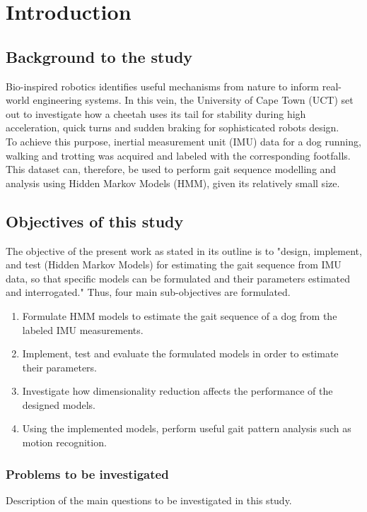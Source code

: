 \chapter{Introduction}

\section{Background to the study}
Bio-inspired robotics identifies useful mechanisms from nature to inform real-world engineering systems. In this vein, the University of Cape Town (UCT) set out to investigate how a cheetah uses its tail for stability during high acceleration, quick turns and sudden braking for sophisticated robots design. \\
To achieve this purpose, inertial measurement unit (IMU) data for a dog running, walking and trotting was acquired and labeled with the corresponding footfalls.\\
This dataset can, therefore, be used to perform gait sequence modelling and analysis using Hidden Markov Models (HMM), given its relatively small size. 	%

\section{Objectives of this study}
The objective of the present work as stated in its outline is to "design, implement, and test (Hidden Markov Models) for estimating the gait sequence
from IMU data, so that specific models can be formulated and their
parameters estimated and interrogated." Thus, four main sub-objectives are formulated.
\begin{enumerate}
	\item Formulate HMM models to estimate the gait sequence of a dog from the labeled IMU measurements.
	\item Implement, test and evaluate the formulated models in order to estimate their parameters.
	\item Investigate how dimensionality reduction affects the performance of the designed models.
	\item Using the implemented models, perform useful gait pattern analysis such as motion recognition.
\end{enumerate}


\subsection{Problems to be investigated}
Description of the main questions to be investigated in this study.

